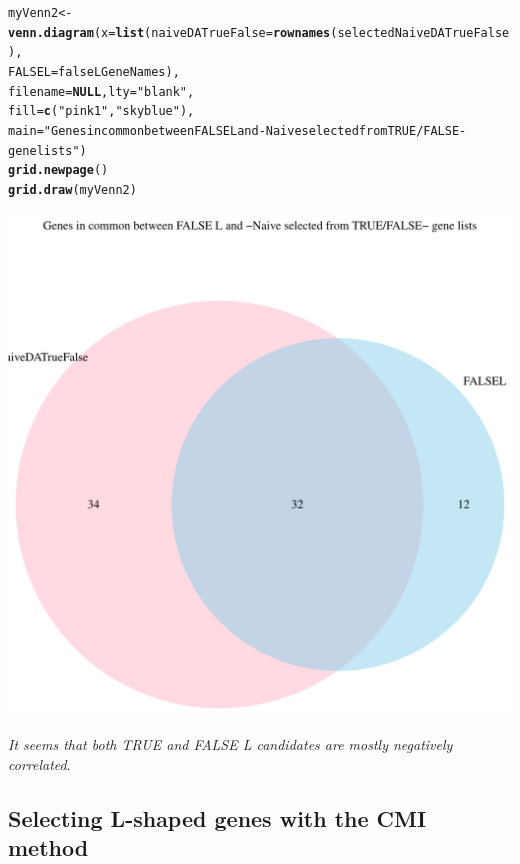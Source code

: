 \documentclass[a4paper,10pt]{article}\usepackage[]{graphicx}\usepackage[]{color}
\makeatletter
\def\maxwidth{ %
  \ifdim\Gin@nat@width>\linewidth
    \linewidth
  \else
    \Gin@nat@width
  \fi
}
\newcommand{\hlstr}[1]{\textcolor[rgb]{0.192,0.494,0.8}{#1}}%
\newcommand{\hlstd}[1]{\textcolor[rgb]{0.345,0.345,0.345}{#1}}%
\newcommand{\hlkwa}[1]{\textcolor[rgb]{0.161,0.373,0.58}{\textbf{#1}}}%
\newcommand{\hlkwb}[1]{\textcolor[rgb]{0.69,0.353,0.396}{#1}}%
\newcommand{\hlkwc}[1]{\textcolor[rgb]{0.333,0.667,0.333}{#1}}%
\newcommand{\hlkwd}[1]{\textcolor[rgb]{0.737,0.353,0.396}{\textbf{#1}}}%
\newenvironment{kframe}{%
 \def\at@end@of@kframe{}%
 \ifinner\ifhmode%
  \def\at@end@of@kframe{\end{minipage}}%
  \begin{minipage}{\columnwidth}%
 \fi\fi%
 \def\FrameCommand##1{\hskip\@totalleftmargin \hskip-\fboxsep
 \colorbox{shadecolor}{##1}\hskip-\fboxsep
     \hskip-\linewidth \hskip-\@totalleftmargin \hskip\columnwidth}%
 \MakeFramed {\advance\hsize-\width
   \@totalleftmargin\z@ \linewidth\hsize
   \@setminipage}}%
 {\par\unskip\endMakeFramed%
 \at@end@of@kframe}
\newenvironment{knitrout}{}{} %
\makeatother
\begin{document}
\begin{knitrout}
\begin{kframe}\begin{alltt}
\hlstd{myVenn2}\hlkwb{<-} \hlkwd{venn.diagram}\hlstd{(}\hlkwc{x}\hlstd{=}\hlkwd{list}\hlstd{(}\hlkwc{naiveDATrueFalse}\hlstd{=}\hlkwd{rownames}\hlstd{(selectedNaiveDATrueFalse),}
                              \hlkwc{FALSEL}\hlstd{=falseLGeneNames),}
                              \hlkwc{filename}\hlstd{=}\hlkwa{NULL}\hlstd{,} \hlkwc{lty} \hlstd{=} \hlstr{"blank"}\hlstd{,}
                              \hlkwc{fill}\hlstd{=}\hlkwd{c}\hlstd{(}\hlstr{"pink1"}\hlstd{,} \hlstr{"skyblue"}\hlstd{),}
                       \hlkwc{main}\hlstd{=}\hlstr{"Genes in common between FALSE L and -Naive selected from TRUE/FALSE- gene lists"}\hlstd{)}
\hlkwd{grid.newpage}\hlstd{()}
\hlkwd{grid.draw}\hlstd{(myVenn2)}
\end{alltt}
\end{kframe}
\includegraphics[width=\maxwidth]{figure/naiveSelTrueFalse-2} 

\end{knitrout}

\emph{It seems that both TRUE and FALSE L candidates are mostly negatively correlated}.


\subsection{Selecting L-shaped genes with the CMI method}
\end{document}
